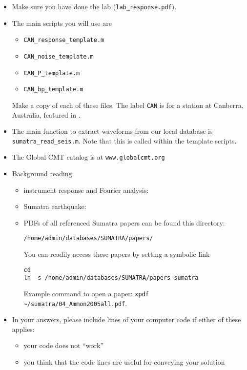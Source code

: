 \documentclass[11pt,titlepage,fleqn]{article}
\begin{document}
\begin{itemize}

\item Make sure you have done the lab (\verb+lab_response.pdf+).

\item The main scripts you will use are
%
\begin{itemize}
\item \verb+CAN_response_template.m+
\item \verb+CAN_noise_template.m+
\item \verb+CAN_P_template.m+
\item \verb+CAN_bp_template.m+
\end{itemize}
%
Make a copy of each of these files. The label \verb+CAN+ is for a station at Canberra, Australia, featured in \citet[][Figure~1]{Park2005}.

\item The main function to extract waveforms from our local database is \verb+sumatra_read_seis.m+. Note that this is called within the template scripts.

\item The Global CMT catalog is at \verb+www.globalcmt.org+

\item Background reading:

\begin{itemize}
\item instrument response and Fourier analysis: \citet[][Ch.~6]{SteinWysession}
\item Sumatra earthquake: \citep{Lay2005,Ammon2005,Park2005,Ni2005}
\item PDFs of all referenced Sumatra papers can be found this directory:
%
\begin{verbatim}
/home/admin/databases/SUMATRA/papers/
\end{verbatim}
%
You can readily access these papers by setting a symbolic link
%
\begin{verbatim}
cd
ln -s /home/admin/databases/SUMATRA/papers sumatra
\end{verbatim}
%
Example command to open a paper: \verb+xpdf ~/sumatra/04_Ammon2005all.pdf+.

\end{itemize}

\item In your answers, please include lines of your computer code if either of these applies:
%
\begin{itemize}
\item your code does not ``work''
\item you think that the code lines are useful for conveying your solution
\end{itemize}


\end{itemize}
\end{document}
